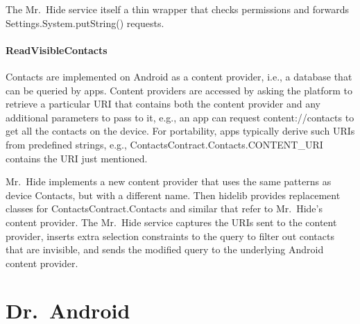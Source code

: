 \documentclass[preprint]{sig-alternate-10pt}
\newcommand{\code}[1]{\textsf{#1}}
\newcommand{\lib}{Mr.\ Hide\xspace}
\newcommand{\rewriter}{Dr.\ Android\xspace}
\newcommand{\bnsp}{\hspace{0pt}} %
\begin{document}
The \lib service itself a thin wrapper that checks permissions and
forwards
\code{Settings.\bnsp{}System.\bnsp{}putString()}
requests.

\paragraph*{ReadVisibleContacts}

Contacts are implemented on Android as a content provider, i.e., a
database that can be queried by apps. Content providers are accessed
by asking the platform to retrieve a particular URI that contains
both the content provider and any additional parameters to pass to
it, e.g., an app can request \code{content://contacts} to get all the
contacts on the device. For portability, apps typically derive such
URIs from predefined strings, e.g., 
\code{ContactsContract.Contacts.CONTENT\bnsp\_URI} contains the URI just
mentioned.

\lib implements a new content provider that uses the same patterns as
device Contacts, but with a different name. Then \code{hidelib}
provides replacement classes for \code{ContactsContract.Contacts} and
similar that refer to \lib's content provider. The \lib service
captures the URIs sent to the content provider, inserts extra
selection constraints to the query to filter out contacts that are
invisible, and sends the modified query to the underlying Android
content provider.


\section{\rewriter}
\label{sec:drandroid}
\end{document}
